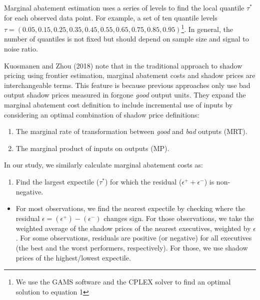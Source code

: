 \documentclass[
  10pt,
]{article}
\providecommand{\tightlist}{%
  \setlength{\itemsep}{0pt}\setlength{\parskip}{0pt}}
\begin{document}
Marginal abatement estimation uses a series of levels to find the local
quantile \(\tau^{*}\) for each observed data point. For example, a set
of ten quantile levels
\(\tau=(0.05,0.15,0.25,0.35,0.45,0.55,0.65,0.75,0.85,0.95)\)\footnote{We
  use the GAMS software and the CPLEX solver to find an optimal solution
  to equation 1}. In general, the number of quantiles is not fixed but
should depend on sample size and signal to noise ratio.

Kuosmanen and Zhou (2018) note that in the traditional approach to
shadow pricing using frontier estimation, marginal abatement costs and
shadow prices are interchangeable terms. This feature is because
previous approaches only use bad output shadow prices measured in
forgone \emph{good} output units. They expand the marginal abatement
cost definition to include incremental use of inputs by considering an
optimal combination of shadow price definitions:

\begin{enumerate}
\def\labelenumi{\arabic{enumi}.}
\tightlist
\item
  The marginal rate of transformation between \emph{good} and \emph{bad}
  outputs (MRT).\\
\item
  The marginal product of inputs on outputs (MP).
\end{enumerate}

In our study, we similarly calculate marginal abatement costs as:

\begin{enumerate}
\def\labelenumi{\arabic{enumi}.}
\tightlist
\item
  Find the largest expectile (\(\tau^{*}\)) for which the residual
  (\(\epsilon^+ + \epsilon^-\)) is non-negative.
\end{enumerate}

\begin{itemize}
\tightlist
\item
  For most observations, we find the nearest expectile by checking where
  the residual \(\epsilon = (\epsilon^+) - (\epsilon^-)\) changes sign.
  For those observations, we take the weighted average of the shadow
  prices of the nearest executives, weighted by \(\epsilon\). For some
  observations, residuals are positive (or negative) for all executives
  (the best and the worst performers, respectively). For those, we use
  shadow prices of the highest/lowest expectile.
\end{itemize}
\end{document}
